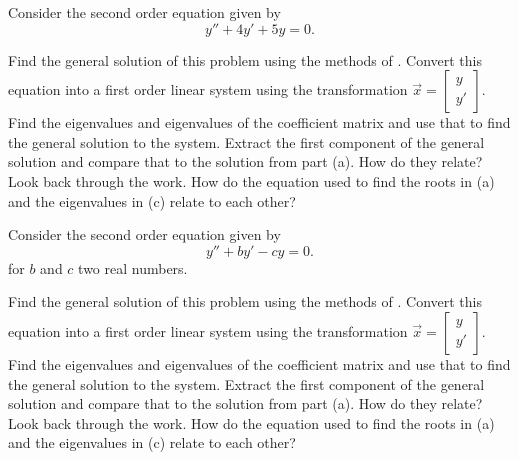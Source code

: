 \begin{exercise}
Consider the second order equation given by
\begin{equation*}
y'' + 4y' + 5y = 0.
\end{equation*}
\begin{tasks}
\task Find the general solution of this problem using the methods of .
\task Convert this equation into a first order linear system using the transformation $\vec{x} = \left[ \begin{smallmatrix} y \\ y' \end{smallmatrix} \right]$. 
\task Find the eigenvalues and eigenvalues of the coefficient matrix and use that to find the general solution to the system.
\task Extract the first component of the general solution and compare that to the solution from part (a). How do they relate?
\task Look back through the work. How do the equation used to find the roots in (a) and the eigenvalues in (c) relate to each other?
\end{tasks}
\end{exercise}

\begin{exercise}
Consider the second order equation given by
\begin{equation*}
y'' + by' - cy = 0.
\end{equation*} for $b$ and $c$ two real numbers.
\begin{tasks}
\task Find the general solution of this problem using the methods of .
\task Convert this equation into a first order linear system using the transformation $\vec{x} = \left[ \begin{smallmatrix} y \\ y' \end{smallmatrix} \right]$. 
\task Find the eigenvalues and eigenvalues of the coefficient matrix and use that to find the general solution to the system.
\task Extract the first component of the general solution and compare that to the solution from part (a). How do they relate?
\task Look back through the work. How do the equation used to find the roots in (a) and the eigenvalues in (c) relate to each other?
\end{tasks}
\end{exercise}



